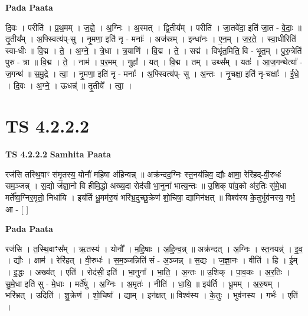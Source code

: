 \documentclass[17pt]{extarticle}
\begin{document}
\textbf{Pada Paata} \newline

दि॒वः । परीति॑ । प्र॒थ॒मम् । ज॒ज्ञे॒ । अ॒ग्निः । अ॒स्मत् । द्वि॒तीय᳚म् । परीति॑ । जा॒तवे॑दा॒ इति॑ जा॒त - वे॒दाः॒ ॥ तृ॒तीय᳚म् । अ॒फ्स्वित्य॑प्-सु । नृ॒मणा॒ इति॑ नृ - मनाः᳚ । अज॑स्रम् । इन्धा॑नः । ए॒न॒म् । ज॒र॒ते॒ । स्वा॒धीरिति॑ स्वा-धीः ॥ वि॒द्म । ते॒ । अ॒ग्ने॒ । त्रे॒धा । त्र॒याणि॑ । वि॒द्म । ते॒ । सद्म॑ । विभृ॑त॒मिति॒ वि - भृ॒त॒म् । पु॒रु॒त्रेति॑ पुरु - त्रा ॥ वि॒द्म । ते॒ । नाम॑ । प॒र॒मम् । गुहा᳚ । यत् । वि॒द्म । तम् । उथ्स᳚म् । यतः॑ । आ॒ज॒गन्थेत्या᳚ - ज॒गन्थ॑ ॥ स॒मु॒द्रे । त्वा॒ । नृ॒मणा॒ इति॑ नृ - मनाः᳚ । अ॒फ्स्वित्य॑प्- सु । अ॒न्तः । नृ॒चक्षा॒ इति॑ नृ-चक्षाः᳚ । ई॒धे॒ । दि॒वः । अ॒ग्ने॒ । ऊधन्न्॑ ॥ तृ॒तीये᳚ । त्वा॒ ।  \newline





\section{ TS 4.2.2.2 }

\textbf{TS 4.2.2.2 } \newline
\textbf{Samhita Paata} \newline

रज॑सि तस्थि॒वाꣳ स॑मृ॒तस्य॒ योनौ॑ महि॒षा अ॑हिन्वन्न् ॥ अक्र॑न्दद॒ग्निः स्त॒नय॑न्निव॒ द्यौः क्षामा॒ रेरि॑हद्-वी॒रुधः॑ सम॒ञ्जन्न् । स॒द्यो ज॑ज्ञा॒नो वि हीमि॒द्धो अख्य॒दा रोद॑सी भा॒नुना॑ भात्य॒न्तः ॥ उ॒शिक् पा॑व॒को अ॑र॒तिः सु॑मे॒धा मर्ते᳚ष्व॒ग्निर॒मृतो॒ निधा॑यि । इय॑र्ति धू॒मम॑रु॒षं भरि॑भ्र॒दुच्छु॒क्रेण॑ शो॒चिषा॒ द्यामिन॑क्षत् ॥ विश्व॑स्य के॒तुर्भुव॑नस्य॒ गर्भ॒ आ - [  ] \newline

\textbf{Pada Paata} \newline

रज॑सि । त॒स्थि॒वाꣳस᳚म् । ऋ॒तस्य॑ । योनौ᳚ । म॒हि॒षाः । अ॒हि॒न्व॒न्न् ॥ अक्र॑न्दत् । अ॒ग्निः । स्त॒नयन्न्॑ । इ॒व॒ । द्यौः । क्षाम॑ । रेरि॑हत् । वी॒रुधः॑ । स॒म॒ञ्जन्निति॑ सं - अ॒ञ्जन्न् ॥ स॒द्यः । ज॒ज्ञा॒नः । वीति॑ । हि । ई॒म् । इ॒द्धः । अख्य॑त् । एति॑ । रोद॑सी॒ इति॑ । भा॒नुना᳚ । भा॒ति॒ । अ॒न्तः ॥ उ॒शिक् । पा॒व॒कः । अ॒र॒तिः । सु॒मे॒धा इति॑ सु - मे॒धाः । मर्ते॑षु । अ॒ग्निः । अ॒मृतः॑ । नीति॑ । धा॒यि॒ ॥ इय॑र्ति । धू॒मम् । अ॒रु॒षम् । भरि॑भ्रत् । उदिति॑ । शु॒क्रेण॑ । शो॒चिषा᳚ । द्याम् । इन॑क्षत् ॥ विश्व॑स्य । के॒तुः । भुव॑नस्य । गर्भः॑ । एति॑ ।  \newline
\end{document}
